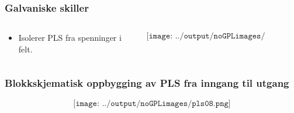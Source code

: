 \documentclass[aspectratio=169,xcolor=dvipsnames]{beamer}
\begin{document}
\begin{frame}
	\frametitle{Galvaniske skiller}
	\begin{columns}
		\begin{column}{0.5\textwidth}
			\begin{itemize}
				\item Isolerer PLS fra spenninger i felt. 
			\end{itemize}

			
		\end{column}

		\begin{column}{0.5\textwidth}
	$$\texttt{[image: ../output/noGPLimages/pls06.png]}$$
		\end{column}
	\end{columns}
\end{frame}




\begin{frame}
	\frametitle{Blokkskjematisk oppbygging av PLS fra inngang til utgang}
	$$\texttt{[image: ../output/noGPLimages/pls08.png]}$$
\end{frame}
\end{document}
